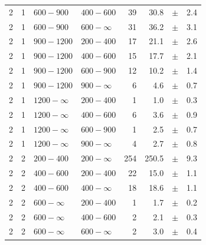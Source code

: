 \begin{table}[!h]
\begin{tabular}{rrllrrcl}
2 & 1 & $ 600- 900$ & $400-600$ &     39 &     30.8 &$\pm$&    2.4 \\
2 & 1 & $ 600- 900$ & $600-\infty$ &     31 &     36.2 &$\pm$&    3.1 \\
2\T & 1 & $ 900-1200$ & $200-400$ &     17 &     21.1 &$\pm$&    2.6 \\
2 & 1 & $ 900-1200$ & $400-600$ &     15 &     17.7 &$\pm$&    2.1 \\
2 & 1 & $ 900-1200$ & $600-900$ &     12 &     10.2 &$\pm$&    1.4 \\
2 & 1 & $ 900-1200$ & $900-\infty$ &      6 &      4.6 &$\pm$&    0.7 \\
2\T & 1 & $1200- \infty$ & $200-400$ &      1 &      1.0 &$\pm$&    0.3 \\
2 & 1 & $1200- \infty$ & $400-600$ &      6 &      3.6 &$\pm$&    0.9 \\
2 & 1 & $1200- \infty$ & $600-900$ &      1 &      2.5 &$\pm$&    0.7 \\
2 & 1 & $1200- \infty$ & $900-\infty$ &      4 &      2.7 &$\pm$&    0.8 \\
2\T & 2 & $ 200- 400$ & $200-\infty$ &    254 &    250.5 &$\pm$&    9.3 \\
2\T & 2 & $ 400- 600$ & $200-400$ &     22 &     15.0 &$\pm$&    1.1 \\
2 & 2 & $ 400- 600$ & $400-\infty$ &     18 &     18.6 &$\pm$&    1.1 \\
2\T & 2 & $ 600- \infty$ & $200-400$ &      1 &      1.7 &$\pm$&    0.2 \\
2 & 2 & $ 600- \infty$ & $400-600$ &      2 &      2.1 &$\pm$&    0.3 \\
2 & 2 & $ 600- \infty$ & $600-\infty$ &      2 &      3.0 &$\pm$&    0.4 \\
    \hline
  \end{tabular}
\end{table}

